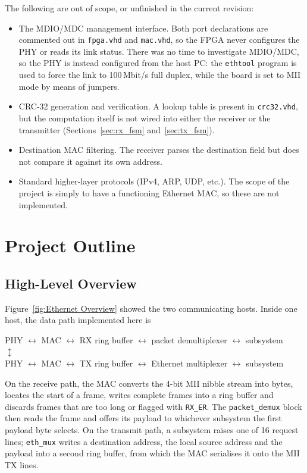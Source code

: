\documentclass[11pt,a4paper]{article}
\begin{document}
The following are out of scope, or unfinished in the current revision:
\begin{itemize}
    \item The MDIO/MDC management interface. Both port declarations are commented out in \texttt{fpga.vhd} and \texttt{mac.vhd}, so the FPGA never configures the PHY or reads its link status. There was no time to investigate MDIO/MDC, so the PHY is instead configured from the host PC: the \texttt{ethtool} program is used to force the link to 100\,Mbit/s full duplex, while the board is set to MII mode by means of jumpers.
    \item CRC-32 generation and verification. A lookup table is present in \texttt{crc32.vhd}, but the computation itself is not wired into either the receiver or the transmitter (Sections~\ref{sec:rx_fsm} and~\ref{sec:tx_fsm}).
    \item Destination MAC filtering. The receiver parses the destination field but does not compare it against its own address.
    \item Standard higher-layer protocols (IPv4, ARP, UDP, etc.). The scope of the project is simply to have a functioning Ethernet MAC, so these are not implemented.
\end{itemize}

\newpage

\section{Project Outline}

\subsection{High-Level Overview}
Figure~\ref{fig:Ethernet Overview} showed the two communicating hosts. Inside one host, the data path implemented here is

\begin{center}
PHY $\leftrightarrow$ MAC $\leftrightarrow$ RX ring buffer $\leftrightarrow$ packet demultiplexer $\leftrightarrow$ subsystem\\
\mbox{}\hfill$\updownarrow$\hfill\mbox{}\\
PHY $\leftrightarrow$ MAC $\leftrightarrow$ TX ring buffer $\leftrightarrow$ Ethernet multiplexer $\leftrightarrow$ subsystem
\end{center}

On the receive path, the MAC converts the 4-bit MII nibble stream into bytes, locates the start of a frame, writes complete frames into a ring buffer and discards frames that are too long or flagged with \texttt{RX\_ER}. The \texttt{packet\_demux} block then reads the frame and offers its payload to whichever subsystem the first payload byte selects. On the transmit path, a subsystem raises one of 16 request lines; \texttt{eth\_mux} writes a destination address, the local source address and the payload into a second ring buffer, from which the MAC serialises it onto the MII TX lines.
\end{document}
